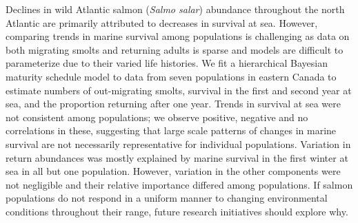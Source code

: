 \documentclass[12pt]{article}
\begin{document}
Declines in wild Atlantic salmon (\emph{Salmo salar}) abundance throughout the north
Atlantic are primarily attributed to decreases in survival at sea.
However, comparing trends in marine survival among populations
is challenging as data on both migrating smolts and returning adults is sparse and
models are difficult to parameterize due to their varied life histories. We fit a hierarchical Bayesian
maturity schedule model to data from seven populations in eastern
Canada to estimate numbers of out-migrating smolts,
survival in the first and second year at sea, and the proportion returning after one year.
Trends in survival at sea were not consistent among populations; we observe
positive, negative and no correlations in these, suggesting that large
scale patterns of changes in marine survival are not necessarily representative for
individual populations.
Variation in return abundances was mostly explained by marine survival in the
first winter at sea in all but one population.
However, variation in the other components were not negligible and
their relative importance differed among populations.
If salmon populations do not respond in a uniform manner to
changing environmental conditions throughout their range,
future research initiatives should explore why.
\end{document}
